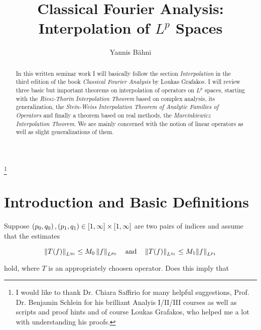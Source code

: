 




\begin{abstract}
	In this written seminar work I will basically follow the section \emph{Interpolation} in the third edition of the book \emph{Classical Fourier Analysis} by Loukas Grafakos. I will review three basic but important theorems on interpolation of operators on $L^p$ spaces, starting with the \emph{Riesz-Thorin Interpolation Theorem} based on complex analysis, its generalization, the \emph{Stein-Weiss Interpolation Theorem of Analytic Families of Operators} and finally a theorem based on real methods, the \emph{Marcinkiewicz Interpolation Theorem}. We are mainly concerned with the notion of linear operators as well as slight generalizations of them. 
\end{abstract}

\title{Classical Fourier Analysis: Interpolation of $L^p$ Spaces}
\author{Yannis B\"{a}hni}
\address[Yannis B\"{a}hni]{University of Zurich, R\"{a}mistrasse 71, 8006 Zurich}
\thanks{I would like to thank Dr. Chiara Saffirio for many helpful suggestions, Prof. Dr. Benjamin Schlein for his brilliant Analyis I/II/III courses as well as scripts and proof hints and of course Loukas Grafakos, who helped me a lot with understanding his proofs.}
\maketitle

\tableofcontents
\listoffigures

\mainsectionstyle

\section{Introduction and Basic Definitions}
Suppose $\del{p_0,q_0},\del{ p_1,q_1} \in \intcc{1,\infty} \times \intcc{1,\infty}$ are two pairs of indices and assume that the estimates 

\begin{equation*}
	\norm[0]{T(f)}_{L^{q_0}} \leq M_0 \norm[0]{f}_{L^{p_0}} \quad \text{and} \quad \norm[0]{T(f)}_{L^{q_1}} \leq M_1\norm{f}_{L^{p_1}}
\end{equation*}

\noindent hold, where $T$ is an appropriately choosen operator. Does this imply that

